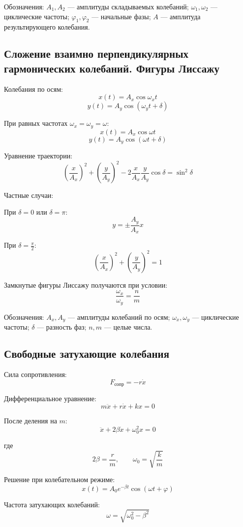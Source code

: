 \documentclass[a4paper,12pt]{article}
\begin{document}
Обозначения:  
\(A_1, A_2\) — амплитуды складываемых колебаний;  
\(\omega_1, \omega_2\) — циклические частоты;  
\(\varphi_1, \varphi_2\) — начальные фазы;  
\(A\) — амплитуда результирующего колебания.

\subsection{Сложение взаимно перпендикулярных гармонических колебаний. Фигуры Лиссажу}

Колебания по осям:
\[
x\left(t\right) = A_x \cos\omega_x t
\]
\[
y\left(t\right) = A_y \cos\left(\omega_y t + \delta\right)
\]

При равных частотах \(\omega_x = \omega_y = \omega\):
\[
x\left(t\right) = A_x \cos\omega t
\]
\[
y\left(t\right) = A_y \cos\left(\omega t + \delta\right)
\]

Уравнение траектории:
\[
\left(\frac{x}{A_x}\right)^2 + \left(\frac{y}{A_y}\right)^2
- 2\frac{x}{A_x}\frac{y}{A_y}\cos\delta = \sin^2\delta
\]

Частные случаи:  

При \(\delta = 0\) или \(\delta = \pi\):
\[
y = \pm \frac{A_y}{A_x}x
\]

При \(\delta = \frac{\pi}{2}\):
\[
\left(\frac{x}{A_x}\right)^2 + \left(\frac{y}{A_y}\right)^2 = 1
\]

Замкнутые фигуры Лиссажу получаются при условии:
\[
\frac{\omega_x}{\omega_y} = \frac{n}{m}
\]

Обозначения:  
\(A_x, A_y\) — амплитуды колебаний по осям;  
\(\omega_x, \omega_y\) — циклические частоты;  
\(\delta\) — разность фаз;  
\(n, m\) — целые числа.

\subsection{Свободные затухающие колебания}

Сила сопротивления:
\[
F_{\text{сопр}} = -r\dot x
\]

Дифференциальное уравнение:
\[
m\ddot x + r\dot x + kx = 0
\]

После деления на \(m\):
\[
\ddot x + 2\beta \dot x + \omega_0^2 x = 0
\]

где
\[
2\beta = \frac{r}{m}, \qquad \omega_0 = \sqrt{\frac{k}{m}}
\]

Решение при колебательном режиме:
\[
x\left(t\right) = A_0 e^{-\beta t}\cos\left(\omega t + \varphi\right)
\]

Частота затухающих колебаний:
\[
\omega = \sqrt{\omega_0^2 - \beta^2}
\]
\end{document}
